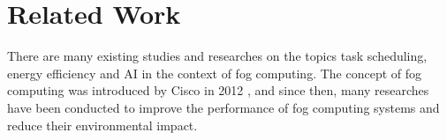 \chapter*{Related Work}
\label{chap:relatedwork}

There are many existing studies and researches on the topics task scheduling, energy efficiency and AI in the context
of fog computing. The concept of fog computing was introduced by Cisco in 2012 \cite{bonomi_et_al_2012}, and since
then, many researches have been conducted to improve the performance of fog computing systems and reduce their
environmental impact.